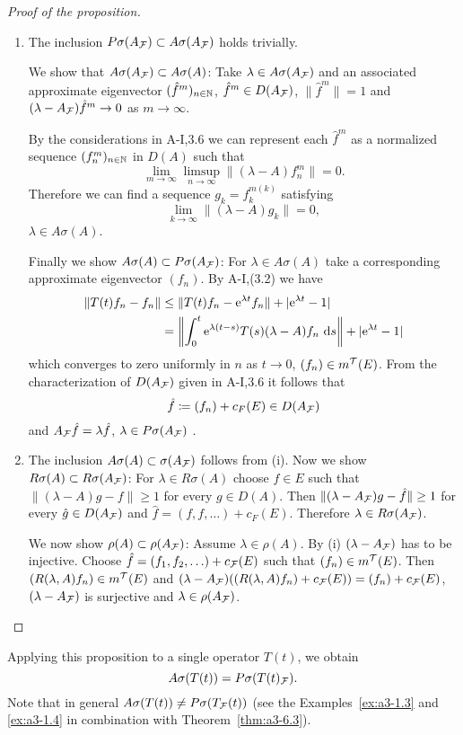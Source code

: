 \begin{proof}[Proof of the proposition]
\begin{enumerate}[\upshape (i), wide, labelsep=.5em]
\item 
The inclusion $P\sigma(A_{\mathcal{F}}) \subset A\sigma(A_{\mathcal{F}})$ holds trivially.

We show that $A\sigma(A_{\mathcal{F}}) \subset A\sigma(A)$: Take $\lambda \in A\sigma(A_{\mathcal{F}})$ and an associated approximate eigenvector $({\hat{f}^{m}})_{n \in \mathbb{N}}$, \ie $\hat{f}^{m} \in D(A_{\mathcal{F}})$, $\|\hat{f}^{m}\| = 1$ and $(\lambda-A_{\mathcal{F}})\hat{f}^{m} \to 0$ as $m \to \infty$.

By the considerations in A-I,3.6 we can represent each $\hat{f}^{m}$ as a normalized sequence $(f_{n}^{m})_{n \in \mathbb{N}}$ in $D(A)$ such that
\[
\lim_{m \to \infty} \limsup_{n \to \infty} \|(\lambda-A)f_{n}^{m}\| = 0 .
\]
Therefore we can find a sequence $g_{k} = f_{k}^{m(k)}$ satisfying
\[
\lim_{k \to \infty} \|(\lambda-A)g_{k}\| = 0 ,
\]
\ie $\lambda \in A\sigma(A)$.

Finally we show $A\sigma(A) \subset P\sigma(A_{\mathcal{F}})$: For $\lambda \in A\sigma(A)$ take a corresponding approximate eigenvector $(f_{n})$.
By A-I,(3.2) we have
\begin{align*}
\|T(t)f_{n} - f_{n}\| &\leq \|T(t)f_{n} - \mathrm{e}^{\lambda t}f_{n}\| + |\mathrm{e}^{\lambda t} - 1| \\
&= \left\|\int_{0}^{t} \mathrm{e}^{\lambda(t-s)}T(s)(\lambda-A)f_{n} \, \mathop{}\!\mathrm{d}{s}\right\| + |\mathrm{e}^{\lambda t} -1|
\end{align*}
which converges to zero uniformly in $n$ as $t \to 0$, \ie $(f_{n}) \in m^{\mathcal{T}}(E)$.
From the characterization of $D(A_{\mathcal{F}})$ given in A-I,3.6 it follows that
\[
\hat{f} \coloneqq (f_{n}) + c_{F}(E) \in D(A_{\mathcal{F}})
\]
and $A_{\mathcal{F}}\hat{f} = \lambda\hat{f}$, \ie $\lambda \in P\sigma(A_{\mathcal{F}})$ .

\item 
The inclusion $A\sigma(A) \subset \sigma(A_{\mathcal{F}})$ follows from (i). Now we show $R\sigma(A) \subset R\sigma(A_{\mathcal{F}})$:
For $\lambda \in R\sigma(A)$ choose $f \in E$ such that $\|(\lambda-A)g - f\| \geq 1$ for every $g \in D(A)$.
Then $\|(\lambda-A_{\mathcal{F}})g - \hat{f}\| \geq 1$ for every $\hat{g} \in D(A_{\mathcal{F}})$ and $\hat{f} = (f,f,\ldots) + c_{F}(E)$.
Therefore $\lambda \in R\sigma(A_{\mathcal{F}})$.

We now show $\rho(A) \subset \rho(A_{\mathcal{F}})$: Assume $\lambda \in \rho(A)$.
By (i) $(\lambda-A_{\mathcal{F}})$ has to be injective.
Choose $\hat{f} = (f_{1},f_{2},\ldots) + c_{\mathcal{F}}(E)$ such that $(f_{n}) \in m^{\mathcal{T}}(E)$.
Then $(R(\lambda,A)f_{n}) \in m^{\mathcal{T}}(E)$ and $(\lambda-A_{\mathcal{F}})((R(\lambda,A)f_{n})+c_{\mathcal{F}}(E)) = (f_{n}) + c_{\mathcal{F}}(E)$, \ie $(\lambda-A_{\mathcal{F}})$ is surjective and $\lambda \in \rho(A_{\mathcal{F}})$.
\end{enumerate}
\end{proof}
Applying this proposition to a single operator $T(t)$, we obtain
\[
A\sigma(T(t)) = P\sigma(T(t)_{\mathcal{F}}) .
\]
Note that in general $A\sigma(T(t)) \neq P\sigma(T_{\mathcal{F}}(t))$ (see the Examples~\ref{ex:a3-1.3} and \ref{ex:a3-1.4} in combination with Theorem~\ref{thm:a3-6.3}).

